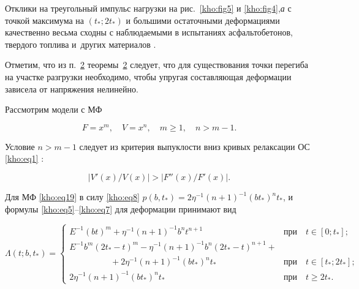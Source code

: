 Отклики на треугольный импульс нагрузки на рис.~\ref{kho:fig5} и \ref{kho:fig4},{\sl а} с точкой максимума на $(t_\ast;2t_\ast)$ и большими остаточными деформациями качественно весьма сходны с наблюдаемыми в испытаниях асфальтобетонов, твердого топлива и~других материалов \cite{kho:bib43}.



Отметим, что из п.~\hyperlink{kh:2p2}{2}  теоремы~\hyperlink{kh:th2}{2}  следует, что для существования точки перегиба на участке разгрузки необходимо, чтобы упругая составляющая деформации зависела от напряжения нелинейно.



\smallskip




Рассмотрим модели с МФ

\begin{equation}

\label{kho:eq19}

F=x^m, \quad V=x^n, \quad m\ge1, \quad n>m-1.

\end{equation}

Условие $n>m-1$ следует из критерия выпуклости вниз кривых релаксации ОС \eqref{kho:eq1} \cite{kho:bib4}: 

$$|V'(x)/V(x)|>|F''(x)/F'(x)|.$$ 

Для МФ \eqref{kho:eq19} в силу \eqref{kho:eq8} $p(b,t_\ast)=2\eta^{-1}(n+1)^{-1}(bt_\ast)^nt_\ast$, и формулы \eqref{kho:eq5}--\eqref{kho:eq7} для деформации принимают вид

\begin{equation}

\label{kho:eq20}

\Lambda(t;b,t_\ast)=

\left\{

\begin{array}{ll}

E^{-1}(bt)^m+\eta^{-1}(n+1)^{-1}b^nt^{n+1} &\text{при~~ } t\in[0;t_\ast];

\\[2mm]

E^{-1}b^m(2t_\ast-t)^m-\eta^{-1}(n+1)^{-1}b^n(2t_\ast-t)^{n+1}+\!\!\!\!\!\! \!\!\!\!\!\! \!\!\!\!\!\! \!\!\!\!\!\!  \!\!\!\!\!\! &

\\

\hspace{2cm} +2\eta^{-1}(n+1)^{-1}(bt_\ast)^nt_\ast &\text{при~~ } t\in[t_\ast;2t_\ast];

\\[2mm]

2\eta ^{ - 1}(n + 1)^{ - 1}(bt_\ast )^n t_\ast  &\text{при~~ } t \ge 2t_\ast .

\end{array}

\right.

\end{equation}



